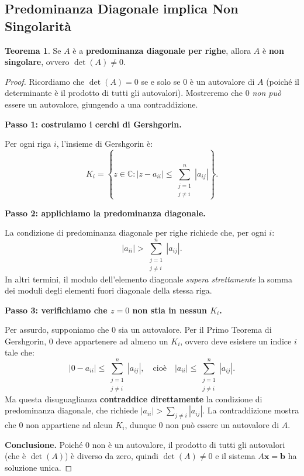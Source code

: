 \documentclass[a4paper,12pt]{article}
\theoremstyle{definition}
\newtheorem{teorema}{Teorema}[section]
\theoremstyle{remark}
\begin{document}
\subsection{Predominanza Diagonale implica Non Singolarità}

\begin{teorema}
Se $A$ è a \textbf{predominanza diagonale per righe}, allora $A$ è \textbf{non singolare},
ovvero $\det(A) \neq 0$.
\end{teorema}

\begin{proof}
Ricordiamo che $\det(A) = 0$ se e solo se $0$ è un autovalore di $A$ (poiché il determinante
è il prodotto di tutti gli autovalori). Mostreremo che $0$ \emph{non può} essere un autovalore,
giungendo a una contraddizione.

\medskip
\noindent\textbf{Passo 1: costruiamo i cerchi di Gershgorin.}

Per ogni riga $i$, l'insieme di Gershgorin è:
\[
  K_i = \left\{ z \in \mathbb{C} : |z - a_{ii}| \leq \sum_{\substack{j=1 \\ j \neq i}}^{n}
  |a_{ij}| \right\}.
\]

\medskip
\noindent\textbf{Passo 2: applichiamo la predominanza diagonale.}

La condizione di predominanza diagonale per righe richiede che, per ogni $i$:
\[
  |a_{ii}| > \sum_{\substack{j=1 \\ j \neq i}}^{n} |a_{ij}|.
\]
In altri termini, il modulo dell'elemento diagonale \emph{supera strettamente} la somma dei
moduli degli elementi fuori diagonale della stessa riga.

\medskip
\noindent\textbf{Passo 3: verifichiamo che $z = 0$ non stia in nessun $K_i$.}

Per assurdo, supponiamo che $0$ sia un autovalore. Per il Primo Teorema di Gershgorin, $0$
deve appartenere ad almeno un $K_i$, ovvero deve esistere un indice $i$ tale che:
\[
  |0 - a_{ii}| \leq \sum_{\substack{j=1 \\ j \neq i}}^{n} |a_{ij}|,
  \quad \text{cioè} \quad
  |a_{ii}| \leq \sum_{\substack{j=1 \\ j \neq i}}^{n} |a_{ij}|.
\]
Ma questa disuguaglianza \textbf{contraddice direttamente} la condizione di predominanza
diagonale, che richiede $|a_{ii}| > \sum_{j \neq i} |a_{ij}|$. La contraddizione mostra
che $0$ non appartiene ad alcun $K_i$, dunque $0$ non può essere un autovalore di $A$.

\medskip
\noindent\textbf{Conclusione.} Poiché $0$ non è un autovalore, il prodotto di tutti gli
autovalori (che è $\det(A)$) è diverso da zero, quindi $\det(A) \neq 0$ e il sistema
$A\mathbf{x} = \mathbf{b}$ ha soluzione unica.
\end{proof}
\end{document}
